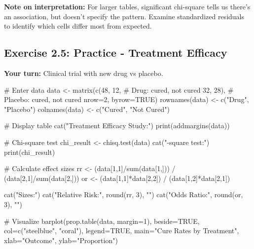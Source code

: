 \documentclass[11pt]{article}
\begin{document}

\textbf{Note on interpretation:} For larger tables, significant chi-square tells us there's an association, but doesn't specify the pattern. Examine standardized residuals to identify which cells differ most from expected.

\subsection{Exercise 2.5: Practice - Treatment Efficacy}

\textbf{Your turn:} Clinical trial with new drug vs placebo.

\begin{rcode}
# Enter data
data <- matrix(c(48, 12,   # Drug: cured, not cured
                 32, 28),  # Placebo: cured, not cured
               nrow=2, byrow=TRUE)
rownames(data) <- c("Drug", "Placebo")
colnames(data) <- c("Cured", "Not Cured")

# Display table
cat("Treatment Efficacy Study:\n")
print(addmargins(data))

# Chi-square test
chi_result <- chisq.test(data)
cat("\nChi-square test:\n")
print(chi_result)

# Calculate effect sizes
rr <- (data[1,1]/sum(data[1,])) / (data[2,1]/sum(data[2,]))
or <- (data[1,1]*data[2,2]) / (data[1,2]*data[2,1])

cat("\nEffect Sizes:\n")
cat("Relative Risk:", round(rr, 3), "\n")
cat("Odds Ratio:", round(or, 3), "\n")

# Visualize
barplot(prop.table(data, margin=1), beside=TRUE,
        col=c("steelblue", "coral"),
        legend=TRUE, main="Cure Rates by Treatment",
        xlab="Outcome", ylab="Proportion")
\end{rcode}
\end{document}
